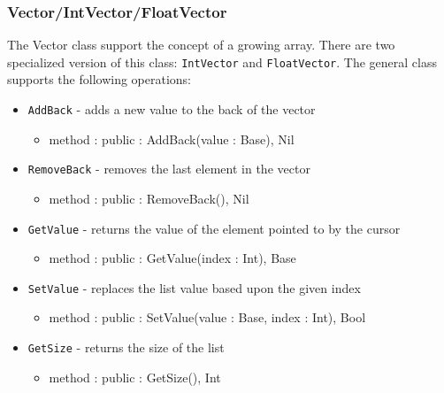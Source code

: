 \documentclass[12pt]{article}
\begin{document}
\subsubsection{Vector/IntVector/FloatVector}
The Vector class support the concept of a growing array.  There are two specialized version of this class: \texttt{IntVector} and \texttt{FloatVector}.  The general class supports the following operations:
\begin{itemize}
    \item \texttt{AddBack} - adds a new value to the back of the vector
    	\begin{itemize}
	\item method : public : AddBack(value : Base), Nil
	\end{itemize}
    \item \texttt{RemoveBack} - removes the last element in the vector
    	\begin{itemize}
	\item method : public : RemoveBack(), Nil
	\end{itemize}
    \item \texttt{GetValue} - returns the value of the element  pointed to by the cursor
    	\begin{itemize}
	\item method : public : GetValue(index : Int), Base
	\end{itemize}
    \item \texttt{SetValue} - replaces the list value based upon the given index
    	\begin{itemize}
	\item method : public : SetValue(value : Base, index : Int), Bool
	\end{itemize}
    \item \texttt{GetSize} - returns the size of the list
    	\begin{itemize}
	\item method : public : GetSize(), Int
	\end{itemize}
\end{itemize}
\end{document}
